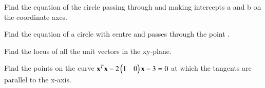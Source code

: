 
\item Find the equation of the circle passing through  and making intercepts a and b on the coordinate axes.
\\
\solution

%
\item Find the equation of a circle with centre  and passes through the point . 
\\
\solution

\item Find the locus of all the unit vectors in the xy-plane.
%
\item Find the points on the curve $\mathbf{x}^T\mathbf{x}-2\begin{pmatrix}1 & 0\end{pmatrix}\mathbf{x} -3 =0$  at which the tangents are parallel to the x-axis.
%
\\
\solution



